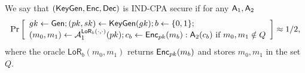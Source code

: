 \begin{definition}
We say that $(\mathsf{KeyGen},\mathsf{Enc},\mathsf{Dec})$ is IND-CPA secure if for any $\mathsf{A}_1,\mathsf{A}_2$
$$
\Pr\left[\begin{array}{l}
gk\gets\mathsf{Gen};(pk,sk)\gets\mathsf{KeyGen}(gk);b\gets\{0,1\};\\
(m_0,m_1)\gets\mathcal{A}_1^{\mathsf{LoR}_b(\cdot,\cdot)}(pk);
c_b\gets\mathsf{Enc}_{pk}(m_b):\mathsf{A}_2(c_b)\text{ if }m_0,m_1\notin Q
\end{array}\right]\approx 1/2,
$$
where the oracle $\mathsf{LoR}_b(m_0,m_1)$ returns $\mathsf{Enc}_{pk}(m_b)$ and stores $m_0,m_1$ in the set $Q$.
\end{definition}
 
